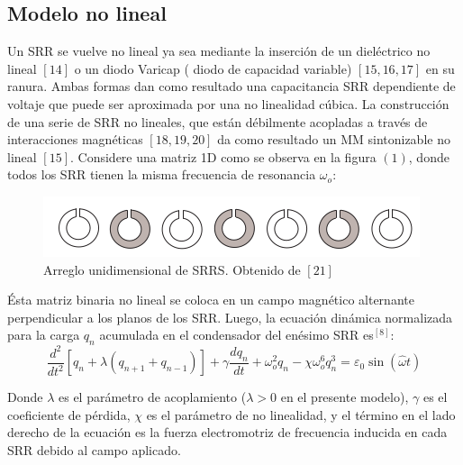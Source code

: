 \documentclass[11pt,letterpaper,twocolumn]{article}
\begin{document}
\subsection*{Modelo no lineal}
Un SRR se vuelve no lineal ya sea mediante la inserción de un dieléctrico no lineal $[14]$ o un diodo Varicap ( diodo de capacidad variable)  $[15,16,17]$ en su ranura. Ambas formas dan como resultado una capacitancia SRR dependiente de voltaje que puede ser aproximada por una no linealidad cúbica. La construcción de una serie de SRR no lineales, que están débilmente acopladas a través de interacciones magnéticas $[18,19,20]$ da como resultado un MM sintonizable no lineal $[15]$. Considere una matriz 1D como se observa en la figura $(1)$, donde todos los SRR tienen la misma frecuencia de resonancia $\omega_{o}$: \\
\begin{figure}[h!]
\centering 
\includegraphics[scale=0.45]{srr.png}
\caption{Arreglo unidimensional de SRR\textquotesingle S. Obtenido de $[21]$}
\end{figure}
\par 
Ésta matriz binaria no lineal se coloca en un campo magnético alternante perpendicular a los planos de los SRR. Luego, la ecuación dinámica normalizada para la carga $q_{n}$ acumulada en el condensador del enésimo SRR es$^{[8]}$:\\
{\fontsize{9}{15}\selectfont
\begin{equation}
\dfrac{d^{2}}{dt^{2}} \left[ q_{n} + \lambda \left( q_{n+1} + q_{n-1}\right) \right] + \gamma \dfrac{d q_{n}}{dt}+ \omega_{o}^{2} q_{n} - \chi \omega_{o}^{6} q_{n}^{3}= \varepsilon_{0} \sin(\hat{\omega}t)
\end{equation} }
\par 
Donde $\lambda$ es el parámetro de acoplamiento ($\lambda > 0$ en el presente modelo), $\gamma$ es el coeficiente de pérdida, $\chi$ es el parámetro de no linealidad, y el término en el lado derecho de la ecuación es la fuerza electromotriz de frecuencia inducida en cada SRR debido al campo aplicado.
\end{document}
